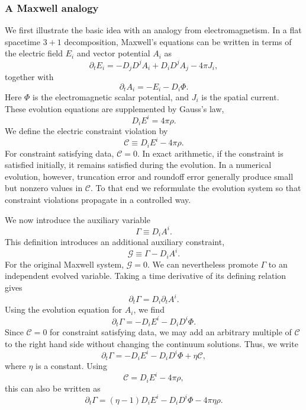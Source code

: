 \subsubsection{A Maxwell analogy}

We first illustrate the basic idea with an analogy from electromagnetism. In a flat spacetime $3+1$ decomposition, Maxwell's equations can be written in terms of the electric field $E_i$ and vector potential $A_i$ as
\begin{equation}
\partial_t E_i
=
-D_jD^j A_i
+
D_iD^j A_j
-
4\pi J_i ,
\end{equation}
together with
\begin{equation}
\partial_t A_i
=
-E_i
-
D_i\Phi .
\end{equation}
Here $\Phi$ is the electromagnetic scalar potential, and $J_i$ is the spatial current. These evolution equations are supplemented by Gauss's law,
\begin{equation}
D_iE^i=4\pi\rho .
\end{equation}
We define the electric constraint violation by
\begin{equation}
\mathcal{C}
\equiv
D_iE^i-4\pi\rho .
\end{equation}
For constraint satisfying data, $\mathcal{C}=0$. In exact arithmetic, if the constraint is satisfied initially, it remains satisfied during the evolution. In a numerical evolution, however, truncation error and roundoff error generally produce small but nonzero values in $\mathcal{C}$. To that end we reformulate the evolution system so that constraint violations propagate in a controlled way.

We now introduce the auxiliary variable
\begin{equation}
\Gamma
\equiv
D_iA^i .
\end{equation}
This definition introduces an additional auxiliary constraint,
\begin{equation}
\mathcal{G}
\equiv
\Gamma-D_iA^i .
\end{equation}
For the original Maxwell system, $\mathcal{G}=0$. We can nevertheless promote $\Gamma$ to an independent evolved variable. Taking a time derivative of its defining relation gives
\begin{equation}
\partial_t\Gamma
=
D_i\partial_t A^i .
\end{equation}
Using the evolution equation for $A_i$, we find
\begin{equation}
\partial_t\Gamma
=
-D_iE^i
-
D_iD^i\Phi .
\end{equation}
Since $\mathcal{C}=0$ for constraint satisfying data, we may add an arbitrary multiple of $\mathcal{C}$ to the right hand side without changing the continuum solutions. Thus, we write
\begin{equation}
\partial_t\Gamma
=
-D_iE^i
-
D_iD^i\Phi
+
\eta\mathcal{C},
\end{equation}
where $\eta$ is a constant. Using
\begin{equation}
\mathcal{C}=D_iE^i-4\pi\rho ,
\end{equation}
this can also be written as
\begin{equation}
\partial_t\Gamma
=
(\eta-1)D_iE^i
-
D_iD^i\Phi
-
4\pi\eta\rho .
\end{equation}

